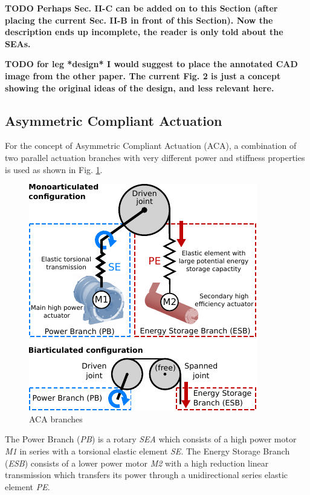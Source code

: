 \documentclass[letterpaper, 10 pt, conference]{ieeeconf}  %
\begin{document}
\textbf{TODO Perhaps Sec. II-C can be added on to this Section (after placing the current Sec. II-B in front of this Section). Now the description ends up incomplete, the reader is only told about the SEAs.}

\textbf{TODO for leg *design* I would suggest to place the annotated CAD image from the other paper. The current Fig. 2 is just a concept showing the original ideas of the design, and less relevant here.}

\subsection{Asymmetric Compliant Actuation}

For the concept of Asymmetric Compliant Actuation (ACA), a combination of two parallel actuation branches with very different power and stiffness properties is used as shown in Fig. \ref{fig:ACA}.



\begin{figure}[b]
	\centering
	\includegraphics[scale=1.0]{actuationConcept}
	\caption{ACA branches}
	\label{fig:ACA}
\end{figure}

The Power Branch (\textit{PB}) is a rotary \textit{SEA} which consists of a high power motor \textit{M1} in series with a torsional elastic element \textit{SE}. The Energy Storage Branch (\textit{ESB}) consists of a lower power motor \textit{M2} with a high reduction linear transmission which transfers its power through a unidirectional series elastic element \textit{PE}.
 
\end{document}
